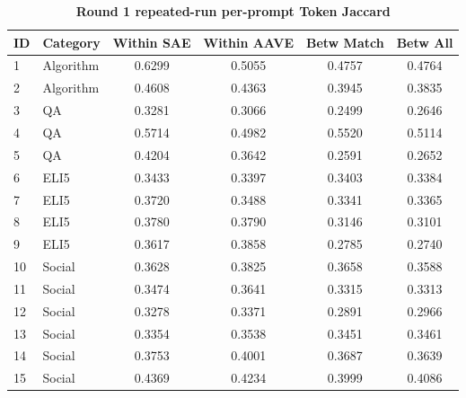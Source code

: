 \begin{table}[htbp]
\centering
\caption{\textbf{Round 1 repeated-run per-prompt Token Jaccard}}
\label{tab:round1-repeated-token-jaccard-per-prompt}
\renewcommand{\arraystretch}{1.4}
\begin{tabular}{|l|l|c|c|c|c|}
\hline
\textbf{ID} & \textbf{Category} & \textbf{Within SAE} & \textbf{Within AAVE} & \textbf{Betw Match} & \textbf{Betw All} \\
\hline
1 & Algorithm & 0.6299 & 0.5055 & 0.4757 & 0.4764 \\
\hline
2 & Algorithm & 0.4608 & 0.4363 & 0.3945 & 0.3835 \\
\hline
3 & QA & 0.3281 & 0.3066 & 0.2499 & 0.2646 \\
\hline
4 & QA & 0.5714 & 0.4982 & 0.5520 & 0.5114 \\
\hline
5 & QA & 0.4204 & 0.3642 & 0.2591 & 0.2652 \\
\hline
6 & ELI5 & 0.3433 & 0.3397 & 0.3403 & 0.3384 \\
\hline
7 & ELI5 & 0.3720 & 0.3488 & 0.3341 & 0.3365 \\
\hline
8 & ELI5 & 0.3780 & 0.3790 & 0.3146 & 0.3101 \\
\hline
9 & ELI5 & 0.3617 & 0.3858 & 0.2785 & 0.2740 \\
\hline
10 & Social & 0.3628 & 0.3825 & 0.3658 & 0.3588 \\
\hline
11 & Social & 0.3474 & 0.3641 & 0.3315 & 0.3313 \\
\hline
12 & Social & 0.3278 & 0.3371 & 0.2891 & 0.2966 \\
\hline
13 & Social & 0.3354 & 0.3538 & 0.3451 & 0.3461 \\
\hline
14 & Social & 0.3753 & 0.4001 & 0.3687 & 0.3639 \\
\hline
15 & Social & 0.4369 & 0.4234 & 0.3999 & 0.4086 \\
\hline
\end{tabular}
\end{table}
